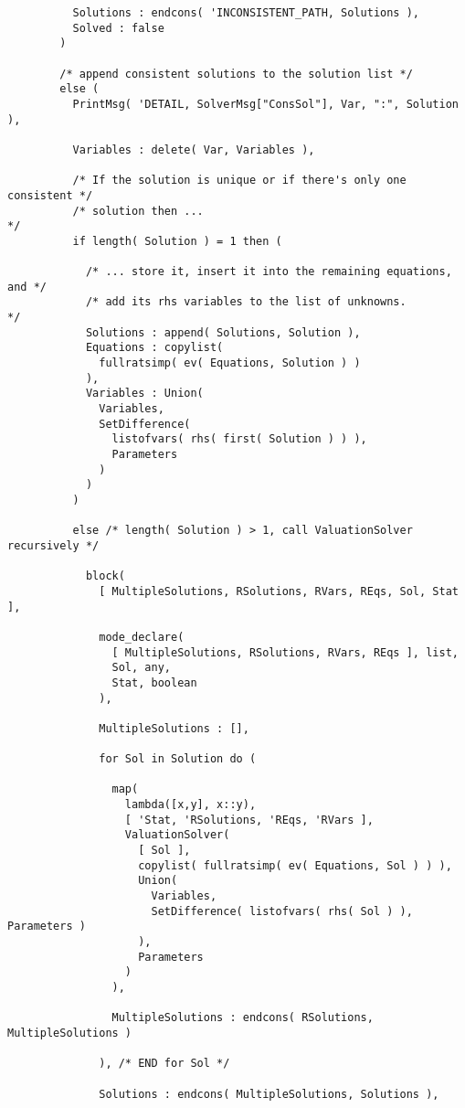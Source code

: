 \begin{verbatim}
          Solutions : endcons( 'INCONSISTENT_PATH, Solutions ),
          Solved : false
        )
 
        /* append consistent solutions to the solution list */
        else (
          PrintMsg( 'DETAIL, SolverMsg["ConsSol"], Var, ":", Solution ),

          Variables : delete( Var, Variables ),

          /* If the solution is unique or if there's only one consistent */
          /* solution then ...                                           */
          if length( Solution ) = 1 then (

            /* ... store it, insert it into the remaining equations, and */
            /* add its rhs variables to the list of unknowns.            */
            Solutions : append( Solutions, Solution ),
            Equations : copylist(
              fullratsimp( ev( Equations, Solution ) )
            ),
            Variables : Union(
              Variables,
              SetDifference(
                listofvars( rhs( first( Solution ) ) ),
                Parameters
              )
            )
          )
          
          else /* length( Solution ) > 1, call ValuationSolver recursively */

            block(
              [ MultipleSolutions, RSolutions, RVars, REqs, Sol, Stat ],

              mode_declare(
                [ MultipleSolutions, RSolutions, RVars, REqs ], list,
                Sol, any,
                Stat, boolean
              ),

              MultipleSolutions : [],

              for Sol in Solution do (

                map(
                  lambda([x,y], x::y),
                  [ 'Stat, 'RSolutions, 'REqs, 'RVars ],
                  ValuationSolver(
                    [ Sol ],
                    copylist( fullratsimp( ev( Equations, Sol ) ) ),
                    Union(
                      Variables,
                      SetDifference( listofvars( rhs( Sol ) ), Parameters )
                    ),
                    Parameters
                  )
                ),

                MultipleSolutions : endcons( RSolutions, MultipleSolutions )

              ), /* END for Sol */

              Solutions : endcons( MultipleSolutions, Solutions ),


\end{verbatim}
